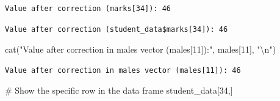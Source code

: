 \documentclass[
  letterpaper,
  DIV=11,
  numbers=noendperiod]{scrartcl}
\newenvironment{Shaded}{\begin{snugshade}}{\end{snugshade}}
\newcommand{\CommentTok}[1]{\textcolor[rgb]{0.37,0.37,0.37}{#1}}
\newcommand{\DecValTok}[1]{\textcolor[rgb]{0.68,0.00,0.00}{#1}}
\newcommand{\FunctionTok}[1]{\textcolor[rgb]{0.28,0.35,0.67}{#1}}
\newcommand{\NormalTok}[1]{\textcolor[rgb]{0.00,0.23,0.31}{#1}}
\newcommand{\OtherTok}[1]{\textcolor[rgb]{0.00,0.23,0.31}{#1}}
\newcommand{\SpecialCharTok}[1]{\textcolor[rgb]{0.37,0.37,0.37}{#1}}
\newcommand{\StringTok}[1]{\textcolor[rgb]{0.13,0.47,0.30}{#1}}
\begin{document}
\begin{Shaded}
\end{Shaded}

\begin{verbatim}
Value after correction (marks[34]): 46 
\end{verbatim}

\begin{Shaded}
\end{Shaded}

\begin{verbatim}
Value after correction (student_data$marks[34]): 46 
\end{verbatim}

\begin{Shaded}
\begin{Highlighting}[]
\FunctionTok{cat}\NormalTok{(}\StringTok{"Value after correction in males vector (males[11]):"}\NormalTok{, males[}\DecValTok{11}\NormalTok{], }\StringTok{"}\SpecialCharTok{\textbackslash{}n}\StringTok{"}\NormalTok{)}
\end{Highlighting}
\end{Shaded}

\begin{verbatim}
Value after correction in males vector (males[11]): 46 
\end{verbatim}

\begin{Shaded}
\begin{Highlighting}[]
\CommentTok{\# Show the specific row in the data frame}
\NormalTok{student\_data[}\DecValTok{34}\NormalTok{,]}
\end{Highlighting}
\end{Shaded}
\end{document}
